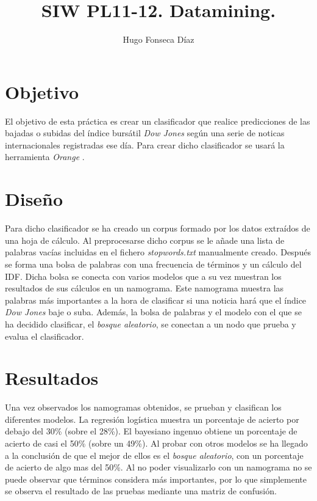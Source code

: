 \documentclass[11pt]{article}
\begin{document}
\title{SIW PL11-12. Datamining.}
\author{Hugo Fonseca Díaz\\ }
\maketitle
\section{Objetivo}
El objetivo de esta práctica es crear un clasificador que realice predicciones de las bajadas o subidas del índice bursátil \textit{Dow Jones} según una serie de noticas internacionales registradas ese día. Para crear dicho clasificador se usará la herramienta \textit{Orange} \cite{orange}.
\section{Diseño}
Para dicho clasificador se ha creado un corpus formado por los datos extraídos de una hoja de cálculo. Al preprocesarse dicho corpus se le añade una lista de palabras vacías incluidas en el fichero \textit{stopwords.txt} manualmente creado. Después se forma una bolsa de palabras con una frecuencia de términos y un cálculo del IDF. Dicha bolsa se conecta con varios modelos que a su vez muestran los resultados de sus cálculos en un namograma. Este namograma muestra las palabras más importantes a la hora de clasificar si una noticia hará que el índice \textit{Dow Jones} baje o suba. Además, la bolsa de palabras y el modelo con el que se ha decidido clasificar, el \textit{bosque aleatorio}, se conectan a un nodo que prueba y evalua el clasificador.
\section{Resultados}
Una vez observados los namogramas obtenidos, se prueban y clasifican los diferentes modelos. La regresión logística muestra un porcentaje de acierto por debajo del 30\% (sobre el 28\%). El bayesiano ingenuo obtiene un porcentaje de acierto de casi el 50\% (sobre un 49\%). Al probar con otros modelos se ha llegado a la conclusión de que el mejor de ellos es el \textit{bosque aleatorio}, con un porcentaje de acierto de algo mas del 50\%. Al no poder visualizarlo con un namograma no se puede observar que términos considera más importantes, por lo que simplemente se observa el resultado de las pruebas mediante una matriz de confusión.
\end{document}

